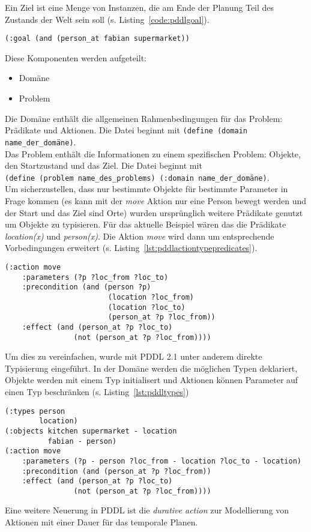 Ein Ziel ist eine Menge von Instanzen, die am Ende der Planung Teil des Zustands der Welt sein soll (s. Listing~\ref{code:pddlgoal}).
\begin{lstlisting}[caption={Ziel in PDDL},language=pddl,label=code:pddlgoal]
(:goal (and (person_at fabian supermarket))
\end{lstlisting}
Diese Komponenten werden aufgeteilt:
\begin{itemize}
    \item Domäne
    \item Problem
\end{itemize}
Die Domäne enthält die allgemeinen Rahmenbedingungen für das Problem: Prädikate und Aktionen.
Die Datei beginnt mit \verb|(define (domain name_der_domäne)|.\\
Das Problem enthält die Informationen zu einem spezifischen Problem: Objekte, den Startzustand und das Ziel.
Die Datei beginnt mit\\\verb|(define (problem name_des_problems) (:domain name_der_domäne)|.\\
Um sicherzustellen, dass nur bestimmte Objekte für bestimmte Parameter in Frage kommen (es kann mit der \emph{move} Aktion nur eine Person bewegt werden und der Start und das Ziel sind Orte) wurden ursprünglich weitere Prädikate genutzt um Objekte zu typisieren.
Für das aktuelle Beispiel wären das die Prädikate \emph{location(x)} und \emph{person(x)}.
Die Aktion \emph{move} wird dann um entsprechende Vorbedingungen erweitert (s. Listing~\ref{lst:pddlactiontypepredicates}).
\begin{lstlisting}[caption={Move Aktion mit Prädikaten zur Typisierung},language=pddl,label={lst:pddlactiontypepredicates}]
(:action move
    :parameters (?p ?loc_from ?loc_to)
    :precondition (and (person ?p)
                        (location ?loc_from)
                        (location ?loc_to)
                        (person_at ?p ?loc_from))
    :effect (and (person_at ?p ?loc_to)
                (not (person_at ?p ?loc_from))))
\end{lstlisting}
Um dies zu vereinfachen, wurde mit \ac{PDDL} 2.1 unter anderem direkte Typisierung eingeführt.
In der Domäne werden die möglichen Typen deklariert, Objekte werden mit einem Typ initialisert und Aktionen können Parameter auf einen Typ beschränken (s. Listing~\ref{lst:pddltypes})
\begin{lstlisting}[caption={Typ Unterstützung in \ac{PDDL} 2.1},language=pddl,label={lst:pddltypes}]
(:types person
        location)
(:objects kitchen supermarket - location
          fabian - person)
(:action move
    :parameters (?p - person ?loc_from - location ?loc_to - location)
    :precondition (and (person_at ?p ?loc_from))
    :effect (and (person_at ?p ?loc_to)
                (not (person_at ?p ?loc_from))))
\end{lstlisting}
Eine weitere Neuerung in \ac{PDDL} ist die \emph{durative action} zur Modellierung von Aktionen mit einer Dauer für das temporale Planen.\\

